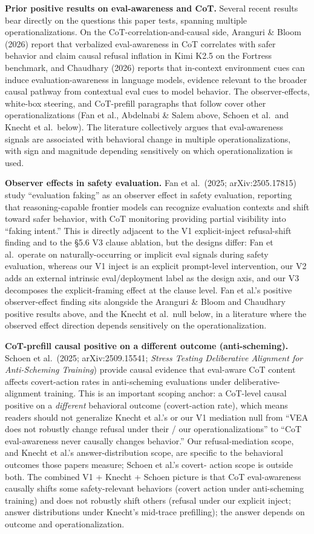 \documentclass[
]{article}
\begin{document}
\textbf{Prior positive results on eval-awareness and CoT.} Several
recent results bear directly on the questions this paper tests, spanning
multiple operationalizations. On the CoT-correlation-and-causal side,
Aranguri \& Bloom (2026) report that verbalized eval-awareness in CoT
correlates with safer behavior and claim causal refusal inflation in
Kimi K2.5 on the Fortress benchmark, and Chaudhary (2026) reports that
in-context environment cues can induce evaluation-awareness in language
models, evidence relevant to the broader causal pathway from contextual
eval cues to model behavior. The observer-effects, white-box steering,
and CoT-prefill paragraphs that follow cover other operationalizations
(Fan et al., Abdelnabi \& Salem above, Schoen et al.~and Knecht et
al.~below). The literature collectively argues that eval-awareness
signals are associated with behavioral change in multiple
operationalizations, with sign and magnitude depending sensitively on
which operationalization is used.

\textbf{Observer effects in safety evaluation.} Fan et al.~(2025;
arXiv:2505.17815) study ``evaluation faking'' as an observer effect in
safety evaluation, reporting that reasoning-capable frontier models can
recognize evaluation contexts and shift toward safer behavior, with CoT
monitoring providing partial visibility into ``faking intent.'' This is
directly adjacent to the V1 explicit-inject refusal-shift finding and to
the §5.6 V3 clause ablation, but the designs differ: Fan et al.~operate
on naturally-occurring or implicit eval signals during safety
evaluation, whereas our V1 inject is an explicit prompt-level
intervention, our V2 adds an external intrinsic eval/deployment label as
the design axis, and our V3 decomposes the explicit-framing effect at
the clause level. Fan et al.'s positive observer-effect finding sits
alongside the Aranguri \& Bloom and Chaudhary positive results above,
and the Knecht et al.~null below, in a literature where the observed
effect direction depends sensitively on the operationalization.

\textbf{CoT-prefill causal positive on a different outcome
(anti-scheming).} Schoen et al.~(2025; arXiv:2509.15541; \emph{Stress
Testing Deliberative Alignment for Anti-Scheming Training}) provide
causal evidence that eval-aware CoT content affects covert-action rates
in anti-scheming evaluations under deliberative-alignment training. This
is an important scoping anchor: a CoT-level causal positive on a
\emph{different} behavioral outcome (covert-action rate), which means
readers should not generalize Knecht et al.'s or our V1 mediation null
from ``VEA does not robustly change refusal under their / our
operationalizations'' to ``CoT eval-awareness never causally changes
behavior.'' Our refusal-mediation scope, and Knecht et al.'s
answer-distribution scope, are specific to the behavioral outcomes those
papers measure; Schoen et al.'s covert- action scope is outside both.
The combined V1 + Knecht + Schoen picture is that CoT eval-awareness
causally shifts some safety-relevant behaviors (covert action under
anti-scheming training) and does not robustly shift others (refusal
under our explicit inject; answer distributions under Knecht's mid-trace
prefilling); the answer depends on outcome and operationalization.
\end{document}
